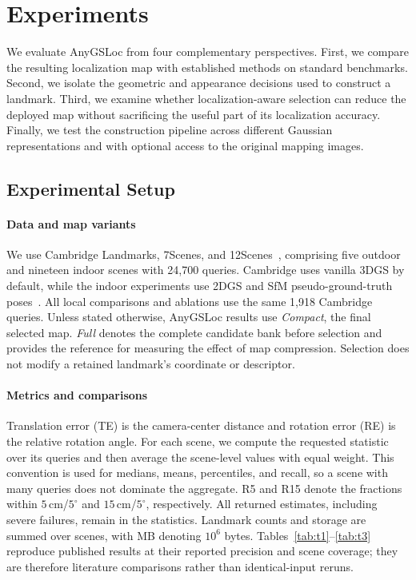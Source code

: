 \section{Experiments}
\label{sec:experiments}

We evaluate AnyGSLoc from four complementary perspectives. First, we compare the resulting localization map with established methods on standard benchmarks. Second, we isolate the geometric and appearance decisions used to construct a landmark. Third, we examine whether localization-aware selection can reduce the deployed map without sacrificing the useful part of its localization accuracy. Finally, we test the construction pipeline across different Gaussian representations and with optional access to the original mapping images.

\subsection{Experimental Setup}
\label{sec:setup}

\paragraph{Data and map variants}
We use Cambridge Landmarks, 7Scenes, and 12Scenes~\cite{kendall2015posenet,shotton2013scenes,valentin2016energy}, comprising five outdoor and nineteen indoor scenes with 24,700 queries. Cambridge uses vanilla 3DGS by default, while the indoor experiments use 2DGS and SfM pseudo-ground-truth poses~\cite{brachmann2021pgt}. All local comparisons and ablations use the same 1,918 Cambridge queries. Unless stated otherwise, AnyGSLoc results use \emph{Compact}, the final selected map. \emph{Full} denotes the complete candidate bank before selection and provides the reference for measuring the effect of map compression. Selection does not modify a retained landmark's coordinate or descriptor.

\paragraph{Metrics and comparisons}
Translation error (TE) is the camera-center distance and rotation error (RE) is the relative rotation angle. For each scene, we compute the requested statistic over its queries and then average the scene-level values with equal weight. This convention is used for medians, means, percentiles, and recall, so a scene with many queries does not dominate the aggregate. R5 and R15 denote the fractions within $5$\,cm/$5^\circ$ and $15$\,cm/$5^\circ$, respectively. All returned estimates, including severe failures, remain in the statistics. Landmark counts and storage are summed over scenes, with MB denoting $10^6$ bytes. Tables~\ref{tab:t1}--\ref{tab:t3} reproduce published results at their reported precision and scene coverage; they are therefore literature comparisons rather than identical-input reruns.

